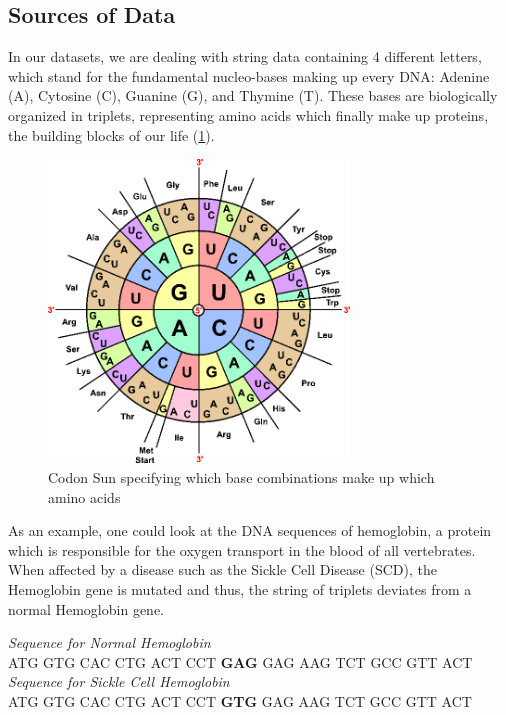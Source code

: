\documentclass[10pt]{article}
\begin{document}
\subsection{Sources of Data}
In our datasets, we are dealing with string data containing 4 different letters, which 
stand for the fundamental nucleo-bases making up every DNA: Adenine (A), Cytosine (C), 
Guanine (G), and Thymine (T). These bases are biologically organized in triplets, 
representing amino acids which finally make up proteins, the building blocks of our life (\cref{figure:codon_sun}).

\begin{figure}[H]
  \centering

  \includegraphics[width=8cm]{codon_sun.png}
  
  \caption{Codon Sun specifying which base combinations make up which amino acids \cite{codonSun}}
  \label{figure:codon_sun}
\end{figure}

As 
an example, one could look at the DNA sequences of hemoglobin, a protein which is 
responsible for the oxygen transport in the blood of all vertebrates. When affected by a 
disease such as the Sickle Cell Disease (SCD), the Hemoglobin gene is mutated and thus, the 
string of triplets deviates from a normal Hemoglobin gene.


\begin{center}
  \emph{Sequence for Normal Hemoglobin}\\
  ATG GTG CAC CTG ACT CCT \textbf{GAG} GAG AAG TCT GCC GTT ACT\\
  \medskip
  \emph{Sequence for Sickle Cell Hemoglobin}\\
  ATG GTG CAC CTG ACT CCT \textbf{GTG} GAG AAG TCT GCC GTT ACT\\
\end{center}
\end{document}
